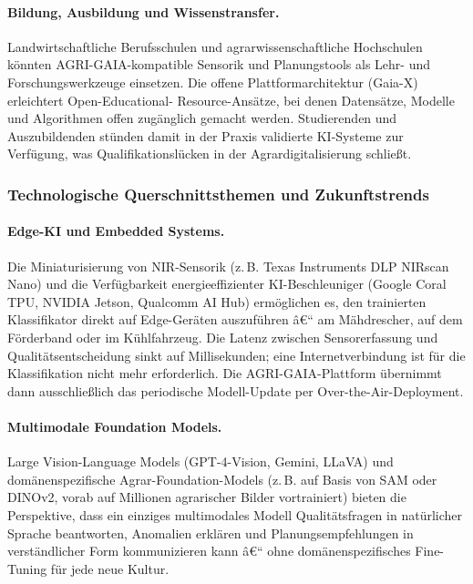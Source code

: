 ﻿\documentclass[12pt,a4paper]{article}
\theoremstyle{plain}
\theoremstyle{definition}
\begin{document}
	\paragraph{Bildung, Ausbildung und Wissenstransfer.}
	Landwirtschaftliche Berufsschulen und agrarwissen\-schaftliche
	Hochschulen könnten AGRI-GAIA-kompatible Sensorik und Planungstools
	als Lehr- und Forschungswerkzeuge einsetzen. Die offene
	Plattformarchitektur (Gaia-X) erleichtert Open-Educational-
	Resource-Ansätze, bei denen Datensätze, Modelle und
	Algorithmen offen zugänglich gemacht werden. Studierenden
	und Auszubildenden stünden damit in der Praxis validierte
	KI-Systeme zur Verfügung, was Qualifikationslücken in der
	Agrardigitalisierung schließt.

	\subsubsection{Technologische Querschnittsthemen und Zukunftstrends}

	\paragraph{Edge-KI und Embedded Systems.}
	Die Miniaturisierung von NIR-Sensorik (z.\,B. Texas Instruments
	DLP NIRscan Nano) und die Verfügbarkeit energieeffizienter
	KI-Beschleuniger (Google Coral TPU, NVIDIA Jetson, Qualcomm AI Hub)
	ermöglichen es, den trainierten Klassifikator direkt auf Edge-Geräten
	auszuführen â€“ am Mähdrescher, auf dem Förderband oder im Kühlfahrzeug.
	Die Latenz zwischen Sensorerfassung und Qualitätsentscheidung
	sinkt auf Millisekunden; eine Internetverbindung ist für die
	Klassifikation nicht mehr erforderlich. Die AGRI-GAIA-Plattform
	übernimmt dann ausschließlich das periodische Modell-Update
	per Over-the-Air-Deployment.

	\paragraph{Multimodale Foundation Models.}
	Large Vision-Language Models (GPT-4-Vision, Gemini, LLaVA) und
	domänenspezifische Agrar-Foundation-Models (z.\,B. auf Basis von
	SAM oder DINOv2, vorab auf Millionen agrarischer Bilder vortrainiert)
	bieten die Perspektive, dass ein einziges multimodales Modell
	Qualitätsfragen in natürlicher Sprache beantworten, Anomalien
	erklären und Planungsempfehlungen in verständlicher Form kommunizieren
	kann â€“ ohne domänenspezifisches Fine-Tuning für jede neue Kultur.
\end{document}
